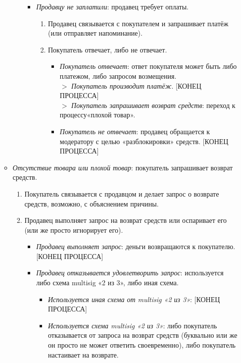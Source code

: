 \begin{enumerate}
\begin{itemize}
\begin{itemize}
\begin{itemize}
                \item {\em Продавцу не заплатили}: продавец требует оплаты.
                \begin{enumerate}
                    \item Продавец связывается с покупателем и запрашивает платёж (или отправ\-ляет напоминание).
                    \item Покупатель отвечает, либо не отвечает.
                    \begin{itemize}
                        \item {\em Покупатель отвечает}: ответ покупателя может быть либо платежом, либо запросом возмещения.\\
                        $>$ {\em Покупатель производит платёж}. [КОНЕЦ ПРОЦЕССА]\\
                        $>$ {\em Покупатель запрашивает возврат средств}: переход к процессу\linebreak «плохой товар».
                        \item {\em Покупатель не отвечает}: продавец обращается к модератору с целью «разблокировки» средств. [КОНЕЦ ПРОЦЕССА]
                    \end{itemize}{}
                \end{enumerate}{}
            \end{itemize}
        \end{itemize}{}
        \item {\em Отсутствие товара или плохой товар}: покупатель запрашивает возврат средств.
        \begin{enumerate}
            \item Покупатель связывается с продавцом и делает запрос о возврате средств, воз\-можно, с объяснением причины.
            \item Продавец выполняет запрос на возврат средств или оспаривает его (или же просто игнорирует его).
            \begin{itemize}
                \item {\em Продавец выполняет запрос}: деньги возвращаются к покупателю. [КОНЕЦ ПРОЦЕССА]
                \item {\em Продавец отказывается удовлетворить запрос}: используется либо схема multisig «2 из 3», либо иная схема.
                \begin{itemize}
                    \item {\em Используется иная схема от multisig «2 из 3»}: [КОНЕЦ ПРОЦЕССА]
                    \item {\em Используется схема multisig «2 из 3»}: либо покупатель отказывается от запроса на возврат средств (буквально или же он просто не может ответить своевременно), либо покупатель настаивает на возврате.

\end{itemize}
\end{itemize}
\end{enumerate}
\end{itemize}
\end{enumerate}
